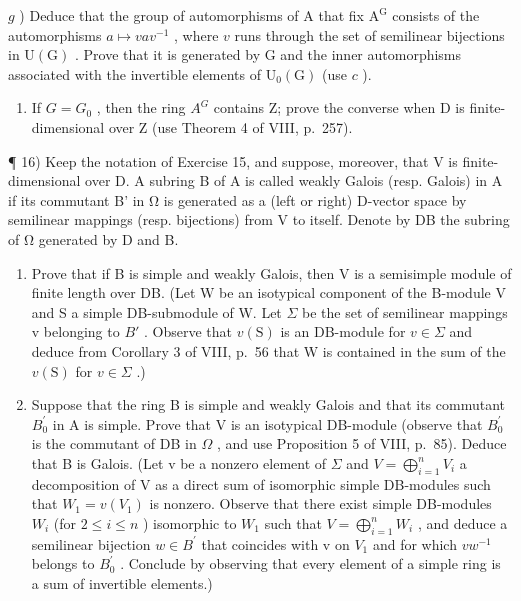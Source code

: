 \(g\) ) Deduce that the group of automorphisms of A that fix \(\mathrm{A}^{\mathrm{G}}\) consists of the automorphisms \(a\mapsto vav^{-1}\) , where \(v\) runs through the set of semilinear bijections in \(\mathrm{U(G)}\) . Prove that it is generated by G and the inner automorphisms associated with the invertible elements of \(\mathrm{U_0(G)}\) (use \(c\) ).

\begin{enumerate}
\def\labelenumi{\alph{enumi})}
\setcounter{enumi}{7}
\tightlist
\item
  If \(G = G_{0}\) , then the ring \(A^{G}\) contains Z; prove the converse when D is finite-dimensional over Z (use Theorem 4 of VIII, p.~257).
\end{enumerate}

¶ 16) Keep the notation of Exercise 15, and suppose, moreover, that V is finite-dimensional over D. A subring B of A is called weakly Galois (resp. Galois) in A if its commutant B' in Ω is generated as a (left or right) D-vector space by semilinear mappings (resp. bijections) from V to itself. Denote by DB the subring of Ω generated by D and B.

\begin{enumerate}
\def\labelenumi{\alph{enumi})}
\item
  Prove that if B is simple and weakly Galois, then V is a semisimple module of finite length over DB. (Let W be an isotypical component of the B-module V and S a simple DB-submodule of W. Let \(\Sigma\) be the set of semilinear mappings v belonging to \(B'\) . Observe that \(v(\mathrm{S})\) is an DB-module for \(v \in \Sigma\) and deduce from Corollary 3 of VIII, p.~56 that W is contained in the sum of the \(v(\mathrm{S})\) for \(v \in \Sigma\) .)
\item
  Suppose that the ring B is simple and weakly Galois and that its commutant \(B_{0}^{\prime}\) in A is simple. Prove that V is an isotypical DB-module (observe that \(B_{0}^{\prime}\) is the commutant of DB in \(\Omega\) , and use Proposition 5 of VIII, p.~85). Deduce that B is Galois. (Let v be a nonzero element of \(\Sigma\) and \(V = \bigoplus_{i=1}^{n} V_{i}\) a decomposition of V as a direct sum of isomorphic simple DB-modules such that \(W_{1} = v(V_{1})\) is nonzero. Observe that there exist simple DB-modules \(W_{i}\) (for \(2 \leqslant i \leqslant n\) ) isomorphic to \(W_{1}\) such that \(V = \bigoplus_{i=1}^{n} W_{i}\) , and deduce a semilinear bijection \(w \in B^{\prime}\) that coincides with v on \(V_{1}\) and for which \(vw^{-1}\) belongs to \(B_{0}^{\prime}\) . Conclude by observing that every element of a simple ring is a sum of invertible elements.)
\end{enumerate}

